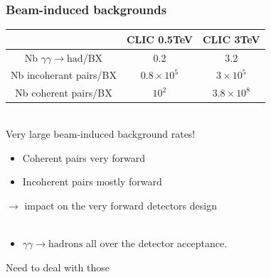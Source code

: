 \documentclass{beamer}
\begin{document}
\begin{frame}
\frametitle{Beam-induced backgrounds}
\begin{center}
\begin{tabular}{ccc}
 & CLIC 0.5TeV & CLIC 3TeV\\
\midrule
Nb $\gamma\gamma\to\textrm{had}$/BX & 0.2 & \alert{3.2}\\
\midrule
Nb incoherant pairs/BX & $0.8\times10^{5}$ & \alert{$3\times10^5$}\\
\midrule
Nb coherent pairs/BX & $10^2$ & $3.8\times 10^8$\\
\bottomrule
\end{tabular}
\end{center}
~\\
\alert{Very large beam-induced background rates!}\\
\begin{itemize}
  \item Coherent pairs very forward
  \item Incoherent pairs mostly forward
\end{itemize}
$\to$ impact on the very forward detectors design\\
~\\
\begin{itemize}
  \item $\gamma\gamma\to\textrm{hadrons}$ all over the detector acceptance.
\end{itemize}
\alert{Need to deal with those}
\end{frame}
\end{document}

